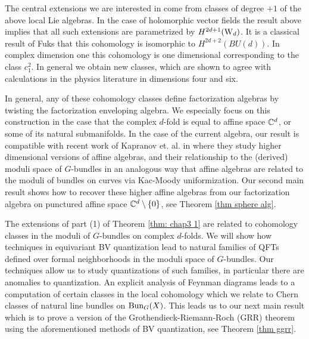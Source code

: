 The central extensions we are interested in come from classes of degree $+1$ of the above local Lie algebras.
In the case of holomorphic vector fields the result above implies that all such extensions are parametrized by $H^{2d+1}({\rm W}_d)$. 
It is a classical result of Fuks \cite{Fuks} that this cohomology is isomorphic to $H^{2d+2}(BU(d))$. 
In complex dimension one this cohomology is one dimensional corresponding to the class $c_1^2$. 
In general we obtain new classes, which are shown to agree with calculations in the physics 
literature in dimensions four and six. 

In general, any of these cohomology classes define factorization algebras by twisting the factorization enveloping algebra. 
We especially focus on this construction in the case that the complex $d$-fold is equal to affine space $\mathbb C^d$, or some of its natural submanifolds.
In the case of the current algebra, our result is compatible with recent work of Kapranov et. al. in \cite{FHK} where they study higher dimensional versions of affine algebras, and their relationship to the (derived) moduli space of $G$-bundles in an analogous way that affine algebras are related to the moduli of bundles on curves via Kac-Moody uniformization.  
Our second main result shows how to recover these higher affine algebras from our factorization algebra on punctured affine space $\mathbb C^d \setminus\{0\}$, see Theorem \ref{thm sphere alg}.

The extensions of part (1) of Theorem \ref{thm: chap3 1} are related to cohomology classes in the moduli of $G$-bundles on complex $d$-folds.
We will show how techniques in equivariant BV quantization lead to natural families of QFTs defined over formal neighborhoods in the moduli space of $G$-bundles. 
Our techniques allow us to study quantizations of such families, in particular there are anomalies to quantization. 
An explicit analysis of Feynman diagrams leads to a computation of certain classes in the local cohomology which we relate to Chern classes of natural line bundles on ${\rm Bun}_G(X)$.
This leads us to our next main result which is to prove a version of the Grothendieck-Riemann-Roch (GRR) theorem using the aforementioned methods of BV quantization, see Theorem \ref{thm ggrr}.


